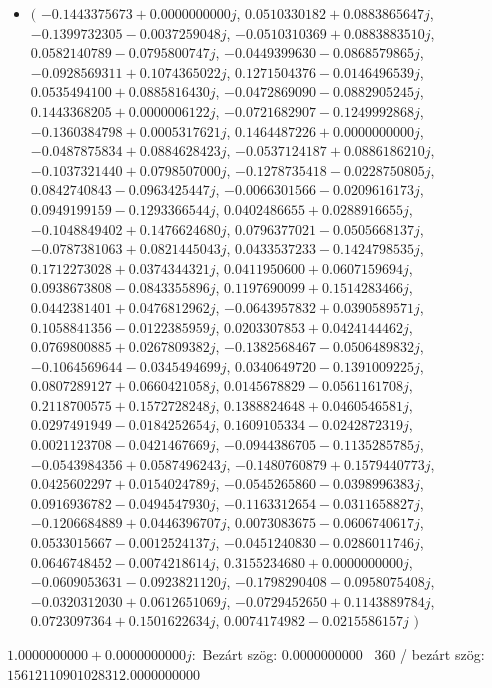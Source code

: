 \documentclass[14pt,a4paper]{article}
\begin{document}
\begin{itemize}
\item
$\big($
$-0.1443375673+0.0000000000j$, $0.0510330182+0.0883865647j$, $-0.1399732305-0.0037259048j$, $-0.0510310369+0.0883883510j$, $0.0582140789-0.0795800747j$, $-0.0449399630-0.0868579865j$, $-0.0928569311+0.1074365022j$, $0.1271504376-0.0146496539j$, $0.0535494100+0.0885816430j$, $-0.0472869090-0.0882905245j$, $0.1443368205+0.0000006122j$, $-0.0721682907-0.1249992868j$, $-0.1360384798+0.0005317621j$, $0.1464487226+0.0000000000j$, $-0.0487875834+0.0884628423j$, $-0.0537124187+0.0886186210j$, $-0.1037321440+0.0798507000j$, $-0.1278735418-0.0228750805j$, $0.0842740843-0.0963425447j$, $-0.0066301566-0.0209616173j$, $0.0949199159-0.1293366544j$, $0.0402486655+0.0288916655j$, $-0.1048849402+0.1476624680j$, $0.0796377021-0.0505668137j$, $-0.0787381063+0.0821445043j$, $0.0433537233-0.1424798535j$, $0.1712273028+0.0374344321j$, $0.0411950600+0.0607159694j$, $0.0938673808-0.0843355896j$, $0.1197690099+0.1514283466j$, $0.0442381401+0.0476812962j$, $-0.0643957832+0.0390589571j$, $0.1058841356-0.0122385959j$, $0.0203307853+0.0424144462j$, $0.0769800885+0.0267809382j$, $-0.1382568467-0.0506489832j$, $-0.1064569644-0.0345494699j$, $0.0340649720-0.1391009225j$, $0.0807289127+0.0660421058j$, $0.0145678829-0.0561161708j$, $0.2118700575+0.1572728248j$, $0.1388824648+0.0460546581j$, $0.0297491949-0.0184252654j$, $0.1609105334-0.0242872319j$, $0.0021123708-0.0421467669j$, $-0.0944386705-0.1135285785j$, $-0.0543984356+0.0587496243j$, $-0.1480760879+0.1579440773j$, $0.0425602297+0.0154024789j$, $-0.0545265860-0.0398996383j$, $0.0916936782-0.0494547930j$, $-0.1163312654-0.0311658827j$, $-0.1206684889+0.0446396707j$, $0.0073083675-0.0606740617j$, $0.0533015667-0.0012524137j$, $-0.0451240830-0.0286011746j$, $0.0646748452-0.0074218614j$, $0.3155234680+0.0000000000j$, $-0.0609053631-0.0923821120j$, $-0.1798290408-0.0958075408j$, $-0.0320312030+0.0612651069j$, $-0.0729452650+0.1143889784j$, $0.0723097364+0.1501622634j$, $0.0074174982-0.0215586157j$
$\big)$
\end{itemize}
$1.0000000000+0.0000000000j$:\
Bezárt szög: $0.0000000000$ \
360 / bezárt szög: $15612110901028312.0000000000$\
\end{document}
